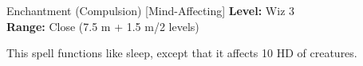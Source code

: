 {Enchantment (Compulsion) [Mind-Affecting]}
{
	\textbf{Level:}
	Wiz 3\\
	\textbf{Range:}
	Close (7.5 m + 1.5 m/2 levels)\\
}
{
	This spell functions like sleep, except that it affects 10 HD of creatures.

}
